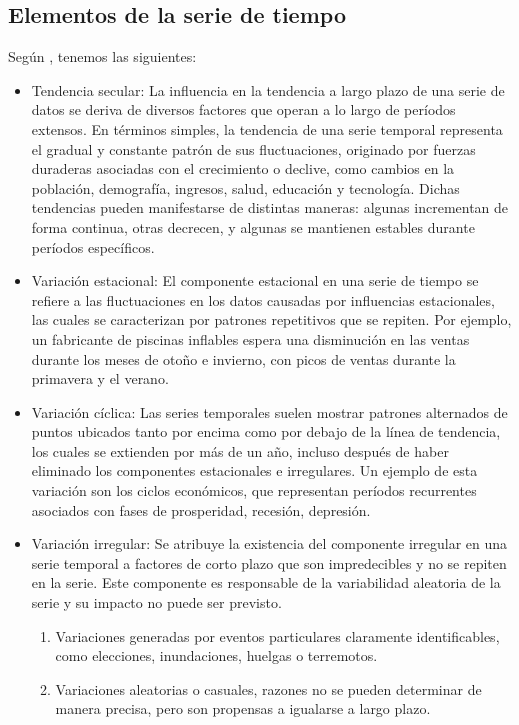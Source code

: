 \subsection{Elementos de la serie de tiempo}
Según \cite{Fierrotorres2022}, tenemos las siguientes:
\begin{itemize}
	\item Tendencia secular: La influencia en la tendencia a largo plazo de una serie de datos se deriva de diversos factores que operan a lo largo de períodos extensos. En términos simples, la tendencia de una serie temporal representa el gradual y constante patrón de sus fluctuaciones, originado por fuerzas duraderas asociadas con el crecimiento o declive, como cambios en la población, demografía, ingresos, salud, educación y tecnología. Dichas tendencias pueden manifestarse de distintas maneras: algunas incrementan de forma continua, otras decrecen, y algunas se mantienen estables durante períodos específicos.
	\item Variación estacional: El componente estacional en una serie de tiempo se refiere a las fluctuaciones en los datos causadas por influencias estacionales, las cuales se caracterizan por patrones repetitivos que se repiten. Por ejemplo, un fabricante de piscinas inflables espera una disminución en las ventas durante los meses de otoño e invierno, con picos de ventas durante la primavera y el verano. 
	\item Variación cíclica: Las series temporales suelen mostrar patrones alternados de puntos ubicados tanto por encima como por debajo de la línea de tendencia, los cuales se extienden por más de un año, incluso después de haber eliminado los componentes estacionales e irregulares. Un ejemplo de esta variación son los ciclos económicos, que representan períodos recurrentes asociados con fases de prosperidad, recesión, depresión. 
	\item Variación irregular: Se atribuye la existencia del componente irregular en una serie temporal a factores de corto plazo que son impredecibles y no se repiten en la serie. Este componente es responsable de la variabilidad aleatoria de la serie y su impacto no puede ser previsto.
	
	\begin{enumerate}
		\item Variaciones generadas por eventos particulares claramente identificables, como elecciones, inundaciones, huelgas o terremotos.
		\item Variaciones aleatorias o casuales, razones no se pueden determinar de manera precisa, pero son propensas a igualarse a largo plazo. 			
	\end{enumerate}
	
\end{itemize}

